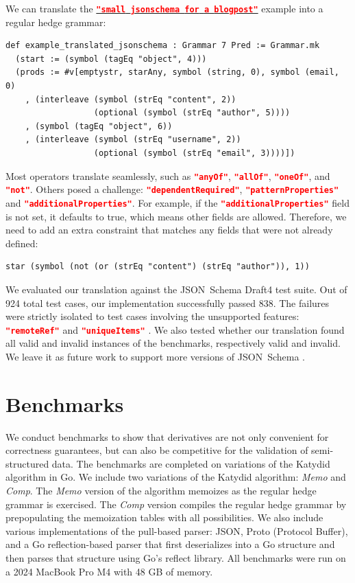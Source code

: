 \documentclass[acmsmall,%
  screen,%
  authorversion, %
  nonacm%
]{acmart}
\newcommand{\jsonlink}[2]{\mbox{\hyperref[#2]{\lstinline[language=json]{#1}}}\xspace}
\newcommand{\JSONSchema}{%
  JSON~Schema\xspace%
}
\newcommand{\uniqueItems}{%
  \lstinline[language=json]|"uniqueItems"|\xspace%
}
\newcommand{\remoteRef}{%
  \lstinline[language=json]|"remoteRef"|\xspace%
}
\newcommand{\JSON}{\ac{JSON}\xspace}
\begin{document}
We can translate the \jsonlink{"small jsonschema for a blogpost"}{jsonschema_blogpost} example into a regular hedge grammar:
\begin{lstlisting}
def example_translated_jsonschema : Grammar 7 Pred := Grammar.mk
  (start := (symbol (tagEq "object", 4)))
  (prods := #v[emptystr, starAny, symbol (string, 0), symbol (email, 0)
    , (interleave (symbol (strEq "content", 2))
                  (optional (symbol (strEq "author", 5))))
    , (symbol (tagEq "object", 6))
    , (interleave (symbol (strEq "username", 2))
                  (optional (symbol (strEq "email", 3))))])
\end{lstlisting}
Most operators translate seamlessly, such as \lstinline[language=json]|"anyOf"|, \lstinline[language=json]|"allOf"|, \lstinline[language=json]|"oneOf"|, and \lstinline[language=json]|"not"|.
Others posed a challenge: \lstinline[language=json]|"dependentRequired"|, \lstinline[language=json]|"patternProperties"| and \lstinline[language=json]|"additionalProperties"|.
For example, if the \lstinline[language=json]|"additionalProperties"| field is not set, it defaults to true, which means other fields are allowed.
Therefore, we need to add an extra constraint that matches any fields that were not already defined:
\begin{lstlisting}
star (symbol (not (or (strEq "content") (strEq "author")), 1))
\end{lstlisting}
We evaluated our translation against the \JSONSchema Draft4 test suite.
Out of 924 total test cases, our implementation successfully passed 838.
The failures were strictly isolated to test cases involving the unsupported features: \remoteRef and \uniqueItems.
We also tested whether our translation found all valid and invalid instances of the benchmarks, respectively valid and invalid.
We leave it as future work to support more versions of \JSONSchema.

\section{Benchmarks}
\label{section_benchmarks}

We conduct benchmarks to show that \citet{brzozowski1964derivatives} derivatives are not only convenient for correctness guarantees, but can also be competitive for the validation of semi-structured data.
The benchmarks are completed on variations of the Katydid algorithm in Go.
We include two variations of the Katydid algorithm: \emph{Memo} and \emph{Comp}.
The \emph{Memo} version of the algorithm memoizes as the regular hedge grammar is exercised. 
The \emph{Comp} version compiles the regular hedge grammar by prepopulating the memoization tables with all possibilities.
We also include various implementations of the pull-based parser: \JSON, Proto (Protocol Buffer), and a Go reflection-based parser that first deserializes into a Go structure and then parses that structure using Go's reflect library.
All benchmarks were run on a 2024 MacBook Pro M4 with 48 GB of memory.
\end{document}
